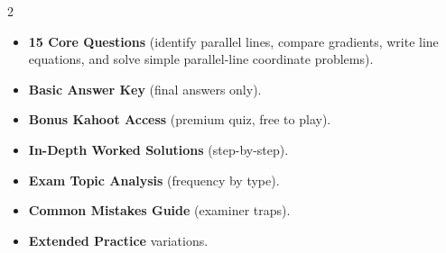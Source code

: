 \documentclass[11pt,a4paper]{article}
\newcommand{\FullReleaseDate}{April 30, 2026}
\begin{document}
\vspace{8pt}

\begin{multicols}{2}
  \begin{tcolorbox}[card, title=\sffamily\bfseries\textcolor{white}{\faHandPointDown\ TODAY (Simplified Version)}, colbacktitle=mainblue, boxed title style={sharp corners, boxrule=0pt}]
    \begin{itemize}[leftmargin=1.2em, itemsep=2pt]
      \item \small \textbf{15 Core Questions} (identify parallel lines, compare gradients, write line equations, and solve simple parallel-line coordinate problems).
      \item \small \textbf{Basic Answer Key} (final answers only).
      \item \small \textbf{Bonus Kahoot Access} (premium quiz, free to play).
    \end{itemize}
  \end{tcolorbox}

  \columnbreak

  \begin{tcolorbox}[card, title=\sffamily\bfseries\textcolor{white}{\faRocket\ ON \FullReleaseDate\ (Full Upgrade)}, colbacktitle=mainblue, boxed title style={sharp corners, boxrule=0pt}]
    \begin{itemize}[leftmargin=1.2em, itemsep=2pt]
      \item \small \textbf{In-Depth Worked Solutions} (step-by-step).
      \item \small \textbf{Exam Topic Analysis} (frequency by type).
      \item \small \textbf{Common Mistakes Guide} (examiner traps).
      \item \small \textbf{Extended Practice} variations.
    \end{itemize}
  \end{tcolorbox}
\end{multicols}
\end{document}
